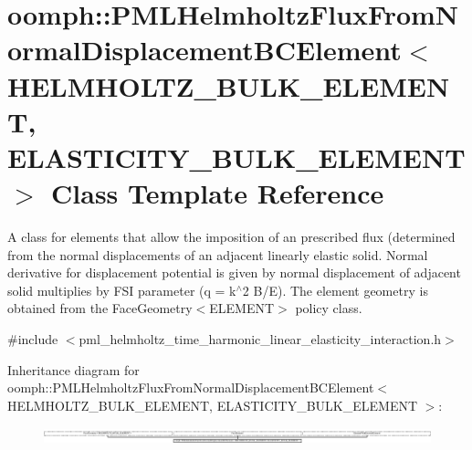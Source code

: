 \hypertarget{classoomph_1_1PMLHelmholtzFluxFromNormalDisplacementBCElement}{}\section{oomph\+:\+:P\+M\+L\+Helmholtz\+Flux\+From\+Normal\+Displacement\+B\+C\+Element$<$ H\+E\+L\+M\+H\+O\+L\+T\+Z\+\_\+\+B\+U\+L\+K\+\_\+\+E\+L\+E\+M\+E\+NT, E\+L\+A\+S\+T\+I\+C\+I\+T\+Y\+\_\+\+B\+U\+L\+K\+\_\+\+E\+L\+E\+M\+E\+NT $>$ Class Template Reference}
\label{classoomph_1_1PMLHelmholtzFluxFromNormalDisplacementBCElement}


A class for elements that allow the imposition of an prescribed flux (determined from the normal displacements of an adjacent linearly elastic solid. Normal derivative for displacement potential is given by normal displacement of adjacent solid multiplies by F\+SI parameter (q = k$^\wedge$2 B/E). The element geometry is obtained from the Face\+Geometry$<$\+E\+L\+E\+M\+E\+N\+T$>$ policy class.  




{\ttfamily \#include $<$pml\+\_\+helmholtz\+\_\+time\+\_\+harmonic\+\_\+linear\+\_\+elasticity\+\_\+interaction.\+h$>$}

Inheritance diagram for oomph\+:\+:P\+M\+L\+Helmholtz\+Flux\+From\+Normal\+Displacement\+B\+C\+Element$<$ H\+E\+L\+M\+H\+O\+L\+T\+Z\+\_\+\+B\+U\+L\+K\+\_\+\+E\+L\+E\+M\+E\+NT, E\+L\+A\+S\+T\+I\+C\+I\+T\+Y\+\_\+\+B\+U\+L\+K\+\_\+\+E\+L\+E\+M\+E\+NT $>$\+:\begin{figure}[H]
\begin{center}
\leavevmode
\includegraphics[height=0.492524cm]{classoomph_1_1PMLHelmholtzFluxFromNormalDisplacementBCElement}
\end{center}
\end{figure}
